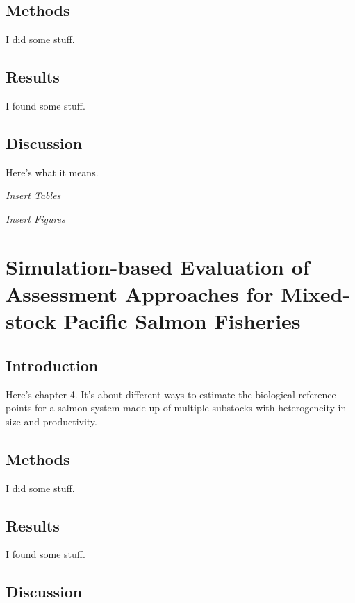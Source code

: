 \documentclass[12pt,]{book}
\theoremstyle{definition}
\theoremstyle{definition}
\theoremstyle{definition}
\theoremstyle{remark}
\begin{document}
\section{Methods}\label{methods-1}

I did some stuff.

\section{Results}\label{results-1}

I found some stuff.

\section{Discussion}\label{discussion-1}

Here's what it means.

\emph{Insert Tables}

\emph{Insert Figures}

\chapter{Simulation-based Evaluation of Assessment Approaches for
Mixed-stock Pacific Salmon Fisheries}\label{ch4}

\section{Introduction}\label{introduction-2}

Here's chapter 4. It's about different ways to estimate the biological
reference points for a salmon system made up of multiple substocks with
heterogeneity in size and productivity.

\section{Methods}\label{methods-2}

I did some stuff.

\section{Results}\label{results-2}

I found some stuff.

\section{Discussion}\label{discussion-2}
\end{document}
